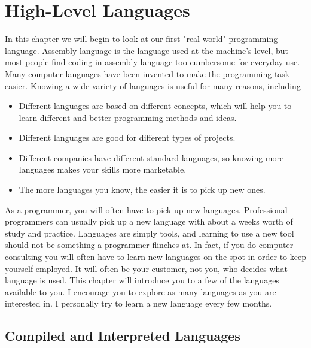 \chapter{High-Level Languages}
\label{highlevellanguages}

% 
% 
% 
% 

In this chapter we will begin to look at our first "real-world"
programming language.  Assembly language is the language used
at the machine's level, but most people find
coding in assembly language too cumbersome for everyday use.
Many computer languages have been invented to make the programming
task easier.  Knowing a wide variety of languages is useful for
many reasons, including

\begin{itemize}\item Different languages are based on different concepts, which will help you to learn different and better programming methods and ideas. 
\item Different languages are good for different types of projects. 
\item Different companies have different standard languages, so knowing more languages makes your skills more marketable. 
\item The more languages you know, the easier it is to pick up new ones. 
\end{itemize}

As a programmer, you will often have to pick up new languages.  Professional
programmers can usually pick up a new language with about a weeks
worth of study and practice.  Languages are simply tools, and learning
to use a new tool should not be something a programmer flinches at.  In fact,
if you do computer consulting you will often have to learn new languages
on the spot in order to keep yourself employed. It will often be your
customer, not you, who decides what language is used.  This
chapter will introduce you to a few of the languages available to you.  
I encourage you to explore as many languages as you are interested in.
I personally try to learn a new language every few months.

\section{Compiled and Interpreted Languages}

